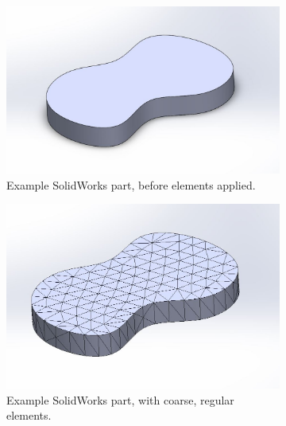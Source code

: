 \begin{figure}
    \centering
    \begin{subfigure}[h]{0.6\textwidth}
        \centering
        \includegraphics[width=\textwidth]{chap3_images/mesh_test_part_no_mesh.JPG}
        \caption{Example SolidWorks part, before elements applied.}
        \label{fig:FEA_mesh_before}
    \end{subfigure}
    \begin{subfigure}[h]{0.6\textwidth}
        \centering
        \includegraphics[width=\textwidth]{chap3_images/mesh_test_part_coarse_mesh.JPG}
        \caption{Example SolidWorks part, with coarse, regular elements.}
        \label{fig:FEA_mesh_coarse}
    \end{subfigure}
    \begin{subfigure}[h]{0.6\textwidth}
        \centering

\end{subfigure}
\end{figure}
